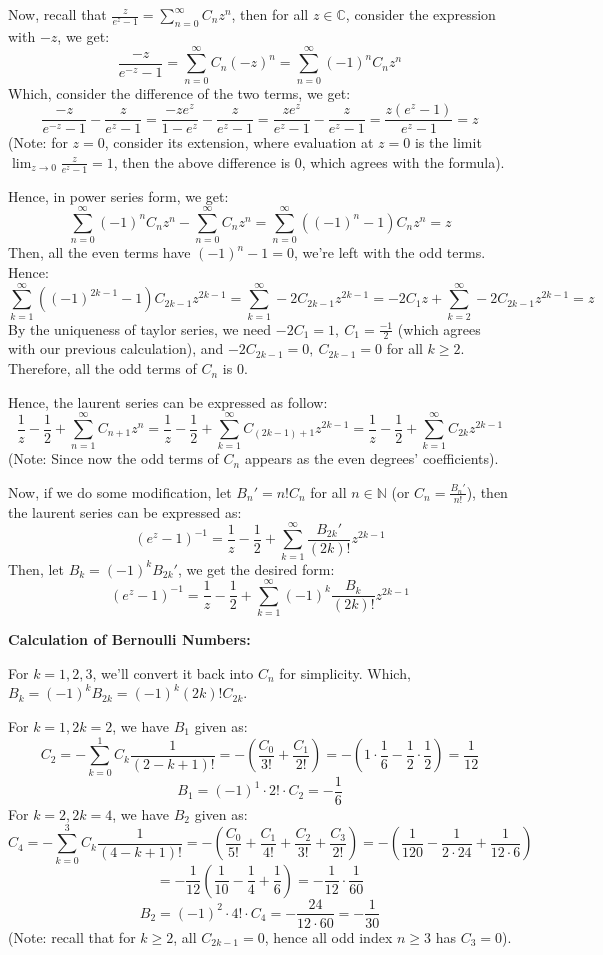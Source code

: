 \documentclass{article}
\begin{document}
Now, recall that $\frac{z}{e^z-1}=\sum_{n=0}^{\infty}C_nz^n$, then for all $z\in\mathbb{C}$, consider the expression with $-z$, we get:
$$\frac{-z}{e^{-z}-1}=\sum_{n=0}^{\infty}C_n(-z)^n = \sum_{n=0}^{\infty}(-1)^nC_nz^n$$
Which, consider the difference of the two terms, we get:
$$\frac{-z}{e^{-z}-1}-\frac{z}{e^z-1} = \frac{-ze^z}{1-e^z}-\frac{z}{e^z-1}=\frac{ze^z}{e^z-1}-\frac{z}{e^z-1}=\frac{z(e^z-1)}{e^z-1}=z$$
(Note: for $z=0$, consider its extension, where evaluation at $z=0$ is the limit $\lim_{z\rightarrow 0}\frac{z}{e^z-1}=1$, then the above difference is $0$, which agrees with the formula).

Hence, in power series form, we get:
$$\sum_{n=0}^{\infty}(-1)^nC_nz^n-\sum_{n=0}^{\infty}C_nz^n = \sum_{n=0}^{\infty}((-1)^n-1)C_nz^n=z$$
Then, all the even terms have $(-1)^n-1=0$, we're left with the odd terms. Hence:
$$\sum_{k=1}^{\infty}((-1)^{2k-1}-1)C_{2k-1}z^{2k-1}=\sum_{k=1}^{\infty}-2C_{2k-1}z^{2k-1}=-2C_1z+\sum_{k=2}^{\infty}-2C_{2k-1}z^{2k-1}=z$$
By the uniqueness of taylor series, we need $-2C_1=1,\ C_1=\frac{-1}{2}$ (which agrees with our previous calculation), and $-2C_{2k-1}=0,\ C_{2k-1}=0$ for all $k\geq 2$.
Therefore, all the odd terms of $C_n$ is $0$.

Hence, the laurent series can be expressed as follow:
$$\frac{1}{z}-\frac{1}{2}+\sum_{n=1}^{\infty}C_{n+1}z^n=\frac{1}{z}-\frac{1}{2}+\sum_{k=1}^{\infty}C_{(2k-1)+1}z^{2k-1}=\frac{1}{z}-\frac{1}{2}+\sum_{k=1}^{\infty}C_{2k}z^{2k-1}$$
(Note: Since now the odd terms of $C_n$ appears as the even degrees' coefficients).

Now, if we do some modification, let $B_n' = n!C_n$ for all $n\in\mathbb{N}$ (or $C_n = \frac{B_n'}{n!}$), then the laurent series can be expressed as:
$$(e^z-1)^{-1}=\frac{1}{z}-\frac{1}{2}+\sum_{k=1}^{\infty}\frac{B_{2k}'}{(2k)!}z^{2k-1}$$
Then, let $B_k=(-1)^kB_{2k}'$, we get the desired form:
$$(e^z-1)^{-1}=\frac{1}{z}-\frac{1}{2}+\sum_{k=1}^{\infty}(-1)^k\frac{B_k}{(2k)!}z^{2k-1}$$

\hfil

\textbf{Calculation of Bernoulli Numbers:}

For $k=1,2,3$, we'll convert it back into $C_n$ for simplicity. Which, $B_k=(-1)^kB_{2k}=(-1)^k(2k)!C_{2k}$.

For $k=1, 2k=2$, we have $B_1$ given as:
$$C_2=-\sum_{k=0}^{1}C_k\frac{1}{(2-k+1)!}=-\left(\frac{C_0}{3!}+\frac{C_1}{2!}\right)=-\left(1\cdot\frac{1}{6}-\frac{1}{2}\cdot\frac{1}{2}\right)=\frac{1}{12}$$
$$B_1=(-1)^1\cdot 2!\cdot C_2 = -\frac{1}{6}$$
For $k=2,2k=4$, we have $B_2$ given as:
$$C_4=-\sum_{k=0}^{3}C_k\frac{1}{(4-k+1)!}=-\left(\frac{C_0}{5!}+\frac{C_1}{4!}+\frac{C_2}{3!}+\frac{C_3}{2!}\right)=-\left(\frac{1}{120}-\frac{1}{2\cdot 24}+\frac{1}{12\cdot 6}\right)$$
$$= -\frac{1}{12}\left(\frac{1}{10}-\frac{1}{4}+\frac{1}{6}\right)=-\frac{1}{12}\cdot\frac{1}{60}$$
$$B_2=(-1)^2\cdot 4!\cdot C_4=-\frac{24}{12\cdot 60}=-\frac{1}{30}$$
(Note: recall that for $k\geq 2$, all $C_{2k-1}=0$, hence all odd index $n\geq 3$ has $C_3=0$).
\end{document}
